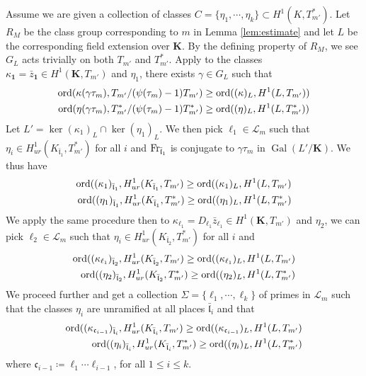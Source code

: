 \documentclass[leqno]{amsart}
\newcommand{\flw}{\bar{\fl}}
\newcommand{\Fr}{\textnormal{Fr}} %
\DeclareMathOperator{\Gal}{Gal}
\newcommand{\ord}{\textnormal{ord}}
\newcommand{\id}{\mathbf{1}}
\newcommand{\K}{{\mathbf{K}}} %
\newcommand{\fc}{\mathfrak{c}}
\newcommand{\fl}{\mathfrak{l}}
\theoremstyle{definition}
\theoremstyle{remark}
\begin{document}
Assume we are given a collection of classes
$C=\{\eta_1,\cdots,\eta_k\}\subset H^1(K,T_{m'}^*)$.
Let $R_M$ be the class group corresponding to $m$ 
in Lemma \ref{lem:estimate}
and let $L$ be the corresponding field extension over  $\K$.
By the defining property of $R_M$,
we see  $G_L$ acts trivially on both  $T_{m'}$ and $T_{m'}^*$.
Apply \cite[Lem 5.2.1]{Rubin}
to the classes $\kappa_{\id}=\bar{z}_{\id}\in H^1(\K,T_{m'})$
and $\eta_1$, 
there exists  $\gamma\in G_L$ such that
\begin{align*}
	\ord(\kappa(\gamma\tau_m),T_{m'}/(\psi(\tau_m)-1)T_{m'})&\geq
	\ord( (\kappa)_L, H^1(L,T_{m'}) )\\
	\ord(\eta(\gamma\tau_m),T_{m'}^*/(\psi(\tau_m)-1)T_{m'}^*)&\geq
	\ord( (\eta)_L, H^1(L,T_{m'}^*) ) 
\end{align*}
Let $L'=\ker(\kappa_1)_L\cap \ker(\eta_1)_L$.
We then pick $\ell_1\in \mathcal{L}_m$ such that
$\eta_i\in H^1_{ur}(K_{\flw_1},T_{m'}^*)$ for all $i$
and $\Fr_{\flw_1}$ is conjugate to $\gamma\tau_m$ in  $\Gal(L'/\K)$.
We thus have
\begin{align*}
	\ord( (\kappa_1)_{\flw_1}, H^1_{ur}(K_{\flw_1}, T_{m'})\geq
	\ord( (\kappa_1)_{L}, H^1(L, T_{m'})\\
	\ord( (\eta_1)_{\flw_1}, H^1_{ur}(K_{\flw_1}, T_{m'}^*)\geq
	\ord( (\eta_1)_{L}, H^1(L, T_{m'}^*)
\end{align*}
We apply the same procedure then to
$\kappa_{\ell_1}=D_{\ell_1}\bar{z}_{\ell_1}\in H^1(\K,T_{m'})$
and $\eta_2$,
we can pick $\ell_2\in \mathcal{L}_m$ such that
$\eta_i\in H^1_{ur}(K_{\flw_2},T_{m'}^*)$ for all $i$ and
\begin{align*}
	\ord( (\kappa_{\ell_1})_{\flw_2}, H^1_{ur}(K_{\flw_2}, T_{m'})\geq
	\ord( (\kappa_{\ell_1})_{L}, H^1(L, T_{m'})\\
	\ord( (\eta_2)_{\flw_2}, H^1_{ur}(K_{\flw_2}, T_{m'}^*)\geq
	\ord( (\eta_2)_{L}, H^1(L, T_{m'}^*)
\end{align*}
We proceed further and get a collection 
$\Sigma=\{\ell_1,\cdots,\ell_k\}$ of primes in $\mathcal{L}_m$
such that the classes  $\eta_i$ are unramified
at all places  $\flw_i$ and that
\begin{align*}
	\ord( (\kappa_{\fc_{i-1}})_{\flw_i}, H^1_{ur}(K_{\flw_i}, T_{m'})\geq
	\ord( (\kappa_{\fc_{i-1}})_{L}, H^1(L, T_{m'})\\
	\ord( (\eta_i)_{\flw_i}, H^1_{ur}(K_{\flw_i}, T_{m'}^*)\geq
	\ord( (\eta_i)_{L}, H^1(L, T_{m'}^*)
\end{align*}
where $\fc_{i-1}\coloneqq \ell_1\cdots\ell_{i-1}$, for all $1\leq i\leq k$.
\end{document}
